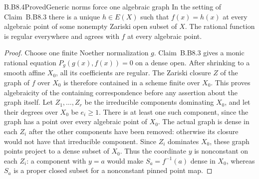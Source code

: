 \begin{claim}{B.B8.4}{Proved}{Generic norms force one algebraic graph}
In the setting of Claim~B.B8.3 there is a unique
$h\in E(X)$ such that $f(x)=h(x)$ at every algebraic point of
some nonempty Zariski open subset of $X$.  The rational function
is regular everywhere and agrees with $f$ at every algebraic
point.
\end{claim}
\begin{proof}
Choose one finite Noether normalization $g$.  Claim~B.B8.3 gives
a monic rational equation $P_g(g(x),f(x))=0$ on a dense open.
After shrinking to a smooth affine $X_0$, all its coefficients are
regular.  The Zariski closure $Z$ of the graph of $f$ over $X_0$
is therefore contained in a scheme finite over $X_0$.
This proves algebraicity of the containing correspondence before
any assertion about the graph itself.  Let $Z_1,\ldots,Z_r$ be
the irreducible components dominating $X_0$, and let their degrees
over $X_0$ be $e_i\geq1$.  There is at least one such component,
since the graph has a point over every algebraic point of $X_0$.
The actual graph is dense in each $Z_i$ after the other components
have been removed: otherwise its closure would not have that
irreducible component.  Since $Z_i$ dominates $X_0$, these graph
points project to a dense subset of $X_0$.  Thus the coordinate
$y$ is nonconstant on each $Z_i$: a component with $y=a$ would
make $S_a=f^{-1}(a)$ dense in $X_0$, whereas $S_a$ is a proper
closed subset for a nonconstant pinned point map.


\end{proof}
